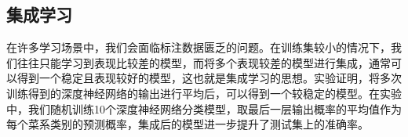 \subsection{集成学习}

在许多学习场景中，我们会面临标注数据匮乏的问题。在训练集较小的情况下，我们往往只能学习到表现比较差的模型，而将多个表现较差的模型进行集成，通常可以得到一个稳定且表现较好的模型，这也就是集成学习\cite{opitz1999popular}的思想。实验证明，将多次训练得到的深度神经网络的输出进行平均后，可以得到一个较稳定的模型\cite{lakshminarayanan2017simple}。在实验中，我们随机训练10个深度神经网络分类模型，取最后一层输出概率的平均值作为每个菜系类别的预测概率，集成后的模型进一步提升了测试集上的准确率。
